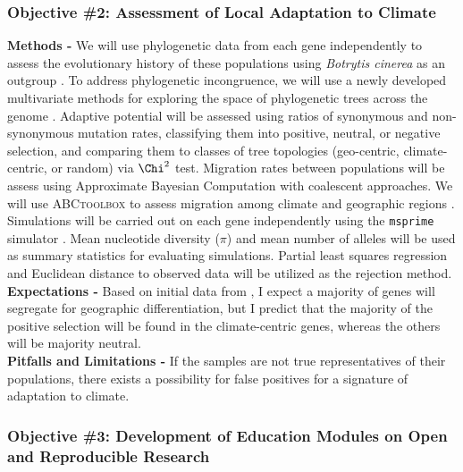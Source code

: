 \documentclass[12pt,letterpaper]{article}
\begin{document}
\subsubsection{Objective \#2: Assessment of Local Adaptation to Climate}

\noindent \textbf{Methods -} We will use phylogenetic data from each gene independently to assess the evolutionary history of these populations using \textit{Botrytis cinerea} as an outgroup \citep{staats2012genome}. 
To address phylogenetic incongruence, we will use a newly developed multivariate methods for exploring the space of phylogenetic trees across the genome \citep{kendall2016mapping, jombart2017treespace}. 
Adaptive potential will be assessed using ratios of synonymous and non-synonymous mutation rates, classifying them into positive, neutral, or negative selection, and comparing them to classes of tree topologies (geo-centric, climate-centric, or random) via $\Chi^2$ test.
Migration rates between populations will be assess using
Approximate Bayesian Computation with coalescent approaches. We will use \textsc{ABCtoolbox} to assess migration among climate and geographic regions \citep{wegmann2010abctoolbox}. 
Simulations will be carried out on each gene independently using the \texttt{msprime} simulator \citep{kelleher2016efficient}. 
Mean nucleotide diversity ($\pi$) and mean number of alleles will be used as summary statistics for evaluating simulations. 
Partial least squares regression and Euclidean distance to observed data will be utilized as the rejection method.\\
\noindent \textbf{Expectations -}
Based on initial data from \citet{attanayake2013sclerotinia}, I expect a majority of genes will segregate for geographic differentiation, but I predict that the majority of the positive selection will be found in the climate-centric genes, whereas the others will be majority neutral.\\
\noindent \textbf{Pitfalls and Limitations -}
If the samples are not true representatives of their populations, there exists a possibility for false positives for a signature of adaptation to climate.\\

\subsubsection{Objective \#3: Development of Education Modules on Open and Reproducible Research}
\end{document}
